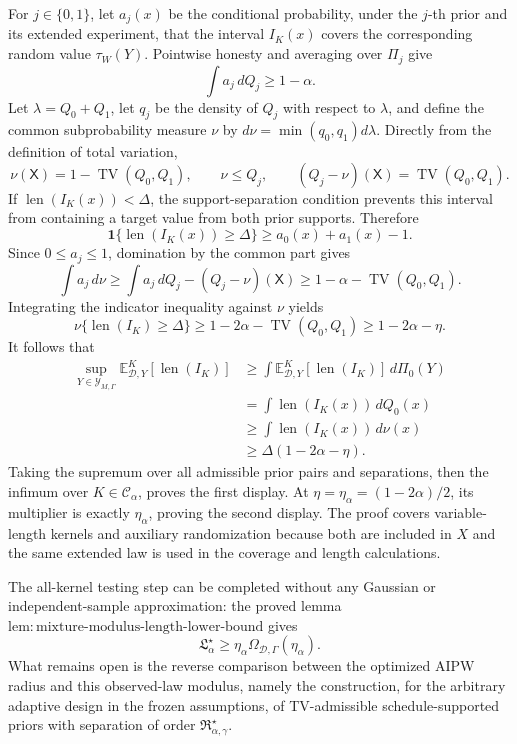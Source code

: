 For \(j\in\{0,1\}\), let \(a_j(x)\) be the conditional probability, under the \(j\)-th prior and its extended experiment, that the interval \(I_K(x)\) covers the corresponding random value \(\tau_W(Y)\).  Pointwise honesty and averaging over \(\Pi_j\) give
\[
\int a_j\,dQ_j\ge1-\alpha.
\]
Let \(\lambda=Q_0+Q_1\), let \(q_j\) be the density of \(Q_j\) with respect to \(\lambda\), and define the common subprobability measure \(\nu\) by
\(d\nu=\min(q_0,q_1)d\lambda\).  Directly from the definition of total variation,
\[
\nu(\mathsf X)=1-\operatorname{TV}(Q_0,Q_1),
\qquad \nu\le Q_j,
\qquad (Q_j-\nu)(\mathsf X)=\operatorname{TV}(Q_0,Q_1).
\]
If \(\operatorname{len}(I_K(x))<\Delta\), the support-separation condition prevents this interval from containing a target value from both prior supports.  Therefore
\[
\mathbf 1\{\operatorname{len}(I_K(x))\ge\Delta\}
\ge a_0(x)+a_1(x)-1.
\]
Since \(0\le a_j\le1\), domination by the common part gives
\[
\int a_j\,d\nu
\ge\int a_j\,dQ_j-(Q_j-\nu)(\mathsf X)
\ge1-\alpha-\operatorname{TV}(Q_0,Q_1).
\]
Integrating the indicator inequality against \(\nu\) yields
\[
\nu\{\operatorname{len}(I_K)\ge\Delta\}
\ge1-2\alpha-\operatorname{TV}(Q_0,Q_1)
\ge1-2\alpha-\eta.
\]
It follows that
\[
\begin{aligned}
\sup_{Y\in\mathcal Y_{M,\Gamma}}
 \mathbb E^K_{\mathcal D,Y}[\operatorname{len}(I_K)]
&\ge \int \mathbb E^K_{\mathcal D,Y}[\operatorname{len}(I_K)]\,d\Pi_0(Y)\\
&=\int\operatorname{len}(I_K(x))\,dQ_0(x)\\
&\ge\int\operatorname{len}(I_K(x))\,d\nu(x)\\
&\ge\Delta(1-2\alpha-\eta).
\end{aligned}
\]
Taking the supremum over all admissible prior pairs and separations, then the infimum over \(K\in\mathcal C_\alpha\), proves the first display.  At \(\eta=\eta_\alpha=(1-2\alpha)/2\), its multiplier is exactly \(\eta_\alpha\), proving the second display.  The proof covers variable-length kernels and auxiliary randomization because both are included in \(X\) and the same extended law is used in the coverage and length calculations.

The all-kernel testing step can be completed without any Gaussian or independent-sample approximation: the proved lemma \(\mathrm{lem:mixture\text{-}modulus\text{-}length\text{-}lower\text{-}bound}\) gives
\[
\mathfrak L_\alpha^\star\ge
\eta_\alpha\Omega_{\mathcal D,\Gamma}(\eta_\alpha).
\]
What remains open is the reverse comparison between the optimized AIPW radius and this observed-law modulus, namely the construction, for the arbitrary adaptive design in the frozen assumptions, of TV-admissible schedule-supported priors with separation of order \(\mathfrak R_{\alpha,\gamma}^\star\).

